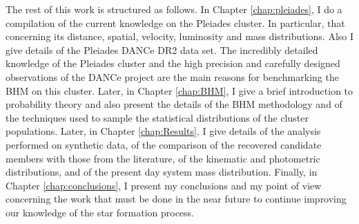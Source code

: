 The rest of this work is structured as follows. In Chapter \ref{chap:pleiades}, I do a compilation of the current knowledge on the Pleiades cluster. In particular, that concerning its distance, spatial, velocity, luminosity and mass distributions. Also I give details of the Pleiades DANCe DR2 data set. The incredibly detailed knowledge of the Pleiades cluster and the high precision and carefully designed observations of the DANCe project are the main reasons for benchmarking the BHM on this cluster. Later, in Chapter \ref{chap:BHM}, I give a brief introduction to probability theory and also present the details of the BHM methodology and of the techniques used to sample the statistical distributions of the cluster populations. Later, in Chapter \ref{chap:Results}, I give details of the analysis performed on synthetic data, of the comparison of the recovered candidate members with those from the literature, of the kinematic and photometric distributions, and of the present day system mass distribution.  Finally, in Chapter \ref{chap:conclusions}, I present my conclusions and my point of view concerning the work that must be done in the near future to continue improving our knowledge of the star formation process.



